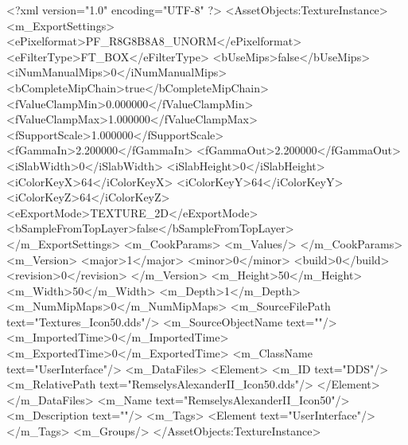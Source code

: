 <?xml version="1.0" encoding="UTF-8" ?>
<AssetObjects:TextureInstance>
	<m_ExportSettings>
		<ePixelformat>PF_R8G8B8A8_UNORM</ePixelformat>
		<eFilterType>FT_BOX</eFilterType>
		<bUseMips>false</bUseMips>
		<iNumManualMips>0</iNumManualMips>
		<bCompleteMipChain>true</bCompleteMipChain>
		<fValueClampMin>0.000000</fValueClampMin>
		<fValueClampMax>1.000000</fValueClampMax>
		<fSupportScale>1.000000</fSupportScale>
		<fGammaIn>2.200000</fGammaIn>
		<fGammaOut>2.200000</fGammaOut>
		<iSlabWidth>0</iSlabWidth>
		<iSlabHeight>0</iSlabHeight>
		<iColorKeyX>64</iColorKeyX>
		<iColorKeyY>64</iColorKeyY>
		<iColorKeyZ>64</iColorKeyZ>
		<eExportMode>TEXTURE_2D</eExportMode>
		<bSampleFromTopLayer>false</bSampleFromTopLayer>
	</m_ExportSettings>
	<m_CookParams>
		<m_Values/>
	</m_CookParams>
	<m_Version>
		<major>1</major>
		<minor>0</minor>
		<build>0</build>
		<revision>0</revision>
	</m_Version>
	<m_Height>50</m_Height>
	<m_Width>50</m_Width>
	<m_Depth>1</m_Depth>
	<m_NumMipMaps>0</m_NumMipMaps>
	<m_SourceFilePath text="Textures\RemselysAlexanderII_Icon50.dds"/>
	<m_SourceObjectName text=""/>
	<m_ImportedTime>0</m_ImportedTime>
	<m_ExportedTime>0</m_ExportedTime>
	<m_ClassName text="UserInterface"/>
	<m_DataFiles>
		<Element>
			<m_ID text="DDS"/>
			<m_RelativePath text="RemselysAlexanderII_Icon50.dds"/>
		</Element>
	</m_DataFiles>
	<m_Name text="RemselysAlexanderII_Icon50"/>
	<m_Description text=""/>
	<m_Tags>
		<Element text="UserInterface"/>
	</m_Tags>
	<m_Groups/>
</AssetObjects:TextureInstance>
